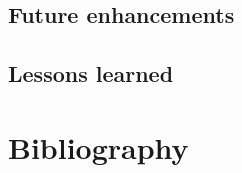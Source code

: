 \documentclass[12pt,a4paper]{report}
\begin{document}
\section{Future enhancements}

\section{Lessons learned}



\chapter*{Bibliography}  
% 
% 
\end{document}
